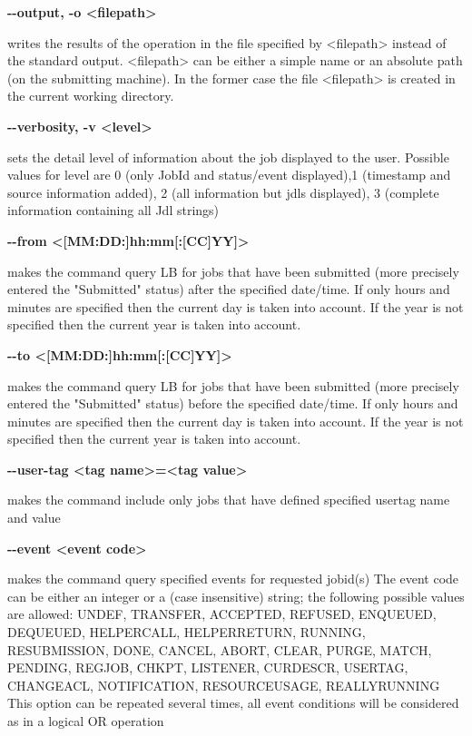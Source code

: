 \textbf{-{}-output, -o <filepath>}

writes the results of the operation in the file specified by <filepath> instead of the standard output. 
<filepath> can be either a simple name or an absolute path (on the submitting machine). In the former case 
the file <filepath> is created in the current working directory.





\textbf{-{}-verbosity, -v <level>}

sets the detail level of information about the job displayed to the user. Possible values for 
level are 0 (only JobId and status/event displayed),1 (timestamp and source information added), 
2 (all information but jdls displayed), 3 (complete information containing all Jdl strings)





\textbf{-{}-from <[MM:DD:]hh:mm[:[CC]YY]>}

makes the command query LB for jobs that have been submitted (more precisely entered the "Submitted" status) 
after the specified date/time.
If only hours and minutes are specified then the current day is taken into account. If the year is not 
specified then the current year is taken into account.





\textbf{-{}-to <[MM:DD:]hh:mm[:[CC]YY]>}

makes the command query LB for jobs that have been submitted (more precisely entered the "Submitted" status) 
before the specified date/time.
If only hours and minutes are specified then the current day is taken into account.
If the year is not specified then the current year is taken into account.





\textbf{-{}-user-tag <tag name>=<tag value>}

makes the command include only jobs that have defined specified usertag name and value





\textbf{-{}-event <event code>}

makes the command query specified events for requested jobid(s)
The event code can be either an integer or a (case insensitive) string; the following possible values are
 allowed:
UNDEF, TRANSFER, ACCEPTED, REFUSED, ENQUEUED, DEQUEUED, HELPERCALL, HELPERRETURN, RUNNING, RESUBMISSION, 
DONE,
CANCEL, ABORT, CLEAR, PURGE, MATCH, PENDING, REGJOB, CHKPT, LISTENER, CURDESCR, USERTAG, CHANGEACL, 
NOTIFICATION,
RESOURCEUSAGE, REALLYRUNNING
This option can be repeated several times, all event conditions will be considered as in a logical OR 
operation

